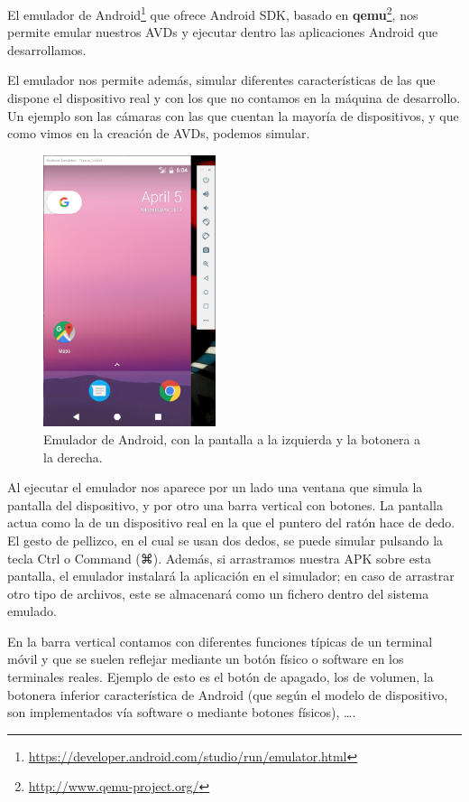 El emulador de Android\footnote{\url{https://developer.android.com/studio/run/emulator.html}} que ofrece Android \gls{SDK}, basado en \textbf{qemu}\footnote{\url{http://www.qemu-project.org/}}, nos permite emular nuestros \glspl{AVD} y ejecutar dentro las aplicaciones Android que desarrollamos.

El emulador nos permite además, simular diferentes características de las que dispone el dispositivo real y con los que no contamos en la máquina de desarrollo. Un ejemplo son las cámaras con las que cuentan la mayoría de dispositivos, y que como vimos en la creación de \glspl{AVD}, podemos simular.

\begin{figure}[H]
\centering
  \includegraphics[width=0.45\textwidth]{Figures/anexo/android_tools/emulator}
  \caption{Emulador de Android, con la pantalla a la izquierda y la botonera a la derecha.}
\end{figure}

Al ejecutar el emulador nos aparece por un lado una ventana que simula la pantalla del dispositivo, y por otro una barra vertical con botones. La pantalla actua como la de un dispositivo real en la que el puntero del ratón hace de dedo. El gesto de pellizco, en el cual se usan dos dedos, se puede simular pulsando la tecla Ctrl o Command (⌘). Además, si arrastramos nuestra \gls{APK} sobre esta pantalla, el emulador instalará la aplicación en el simulador; en caso de arrastrar otro tipo de archivos, este se almacenará como un fichero dentro del sistema emulado.

En la barra vertical contamos con diferentes funciones típicas de un terminal móvil y que se suelen reflejar mediante un botón físico o software en los terminales reales. Ejemplo de esto es el botón de apagado, los de volumen, la botonera inferior característica de Android (que según el modelo de dispositivo, son implementados vía software o mediante botones físicos), \ldots.

